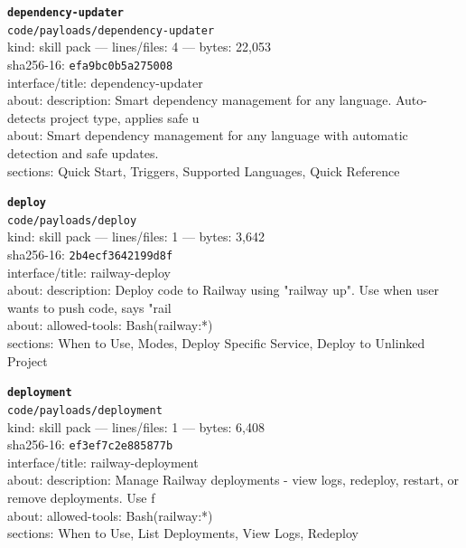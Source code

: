 \noindent\textbf{\texttt{dependency-updater}}\\
\texttt{code/payloads/dependency-updater}\\
kind: skill pack --- lines/files: 4 --- bytes: 22,053\\
sha256-16: \texttt{efa9bc0b5a275008}\\
interface/title: dependency-updater\\
about: description: Smart dependency management for any language. Auto-detects project type, applies safe u\\
about: Smart dependency management for any language with automatic detection and safe updates.\\
sections: Quick Start, Triggers, Supported Languages, Quick Reference\\
\vspace*{6.0pt}

\noindent\textbf{\texttt{deploy}}\\
\texttt{code/payloads/deploy}\\
kind: skill pack --- lines/files: 1 --- bytes: 3,642\\
sha256-16: \texttt{2b4ecf3642199d8f}\\
interface/title: railway-deploy\\
about: description: Deploy code to Railway using "railway up". Use when user wants to push code, says "rail\\
about: allowed-tools: Bash(railway:*)\\
sections: When to Use, Modes, Deploy Specific Service, Deploy to Unlinked Project\\
\vspace*{6.0pt}
\newpage

\noindent\textbf{\texttt{deployment}}\\
\texttt{code/payloads/deployment}\\
kind: skill pack --- lines/files: 1 --- bytes: 6,408\\
sha256-16: \texttt{ef3ef7c2e885877b}\\
interface/title: railway-deployment\\
about: description: Manage Railway deployments - view logs, redeploy, restart, or remove deployments. Use f\\
about: allowed-tools: Bash(railway:*)\\
sections: When to Use, List Deployments, View Logs, Redeploy\\
\vspace*{6.0pt}


